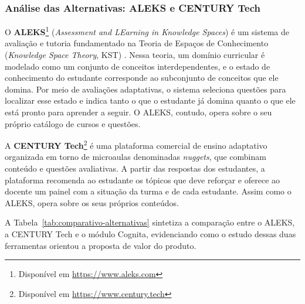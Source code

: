 \subsubsection{Análise das Alternativas: ALEKS e CENTURY Tech}
\label{subsubsec:analise-alternativas}

O \textbf{ALEKS}\footnote{Disponível em \url{https://www.aleks.com}} (\textit{Assessment and LEarning in Knowledge Spaces}) é um sistema de avaliação e tutoria fundamentado na Teoria de Espaços de Conhecimento (\textit{Knowledge Space Theory}, KST) \cite{falmagne_learning_2011}. Nessa teoria, um domínio curricular é modelado como um conjunto de conceitos interdependentes, e o estado de conhecimento do estudante corresponde ao subconjunto de conceitos que ele domina. Por meio de avaliações adaptativas, o sistema seleciona questões para localizar esse estado e indica tanto o que o estudante já domina quanto o que ele está pronto para aprender a seguir. O ALEKS, contudo, opera sobre o seu próprio catálogo de cursos e questões.

A \textbf{CENTURY Tech}\footnote{Disponível em \url{https://www.century.tech}} é uma plataforma comercial de ensino adaptativo organizada em torno de microaulas denominadas \textit{nuggets}, que combinam conteúdo e questões avaliativas. A partir das respostas dos estudantes, a plataforma recomenda ao estudante os tópicos que deve reforçar e oferece ao docente um painel com a situação da turma e de cada estudante. Assim como o ALEKS, opera sobre os seus próprios conteúdos.

A Tabela~\ref{tab:comparativo-alternativas} sintetiza a comparação entre o ALEKS, a CENTURY Tech e o módulo Cognita, evidenciando como o estudo dessas duas ferramentas orientou a proposta de valor do produto.

